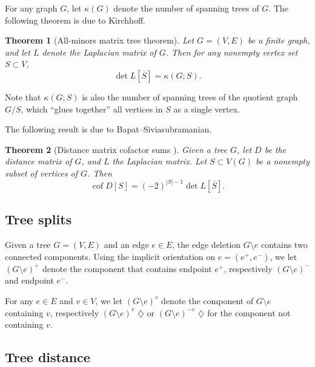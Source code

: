 \documentclass{amsart}
\newtheorem{thm}{Theorem}
\theoremstyle{definition}
\DeclareMathOperator{\cof}{cof}
\newcommand{\note}[1]{{\color{red} \sf $\diamondsuit$  {#1} $\diamondsuit$ }}
\begin{document}
For any graph $G$, let $\kappa(G)$ denote the number of spanning trees of $G$.
The following theorem is due to Kirchhoff.
\begin{thm}[All-minors matrix tree theorem]
\label{thm:matrix-tree}
Let $G = (V,E)$ be a finite graph,
and let $L$ denote the Laplacian matrix of $G$.
Then for any nonempty vertex set $S \subset V$,
\begin{equation}
\det L[\overline S] = \kappa( G ; S) .
\end{equation}
\end{thm}
Note that $\kappa(G;S)$ is also the number of 
spanning trees of the quotient graph $G / S$, which ``glues together'' all vertices in $S$ as a single vertex.

The following result is due to Bapat--Siviasubramanian.
\begin{thm}[Distance matrix cofactor sums \cite{bapat-sivasubramanian}]
Given a tree $G$,
let $D$ be the distance matrix of $G$, and $L$ the Laplacian matrix.
Let $S \subset V(G)$ be a nonempty subset of vertices of $G$. 
Then
\begin{equation*}
\cof D[S] = (-2)^{|S|-1} \det L[\overline S] .
\end{equation*}
\end{thm}


\subsection{Tree splits}
\label{sec:splits}

Given a tree $G = (V,E)$ and an edge $e \in E$, the edge deletion $G \setminus e$ contains two connected components.
Using the implicit orientation on $e = (e^+,e^-)$,
we let $(G \setminus e)^+$ denote the component that contains endpoint $e^+$, respectively $(G\setminus e)^-$ and endpoint $e^-$.

For any $e \in E$ and $v \in V$,
we let
$(G \setminus e)^{v}$ denote the component of $G\setminus e$ containing $v$,
respectively $(G\setminus e)^{\overline v}$ \note{or $(G\setminus e)^{- v}$} for the component not containing $v$.

\subsection{Tree distance}
\label{sec:tree-distance}
\end{document}
